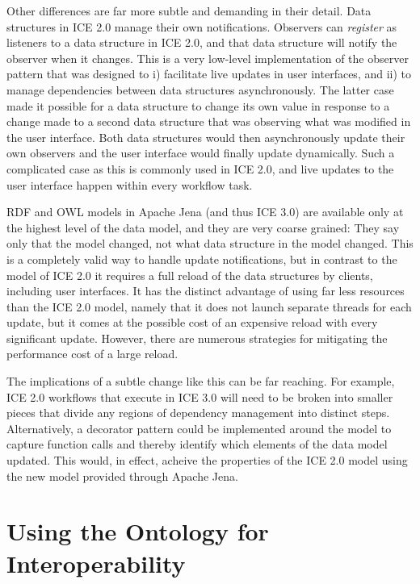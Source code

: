 Other differences are far more subtle and demanding in their detail. Data
structures in ICE 2.0 manage their own notifications. Observers can
\textit{register} as listeners to a data structure in ICE 2.0, and that data
structure will notify the observer when it changes. This is a very low-level
implementation of the observer pattern that was designed
to i) facilitate live updates in user interfaces, and ii) to manage dependencies
between data structures asynchronously. The latter case made it possible for a
data structure to change its own value in response to a change made to a second
data structure that was observing what was modified in the user interface. Both
data structures would then asynchronously update their own observers and the
user interface would finally update dynamically. Such a complicated case as
this is commonly used in ICE 2.0, and live updates to the user interface happen
within every workflow task.

RDF and OWL models in Apache Jena (and thus ICE 3.0) are available only at the
highest level of the data model, and they are very coarse grained: They say only
that the model changed, not what data structure in the model changed. This is a
completely valid way to handle update notifications, but in contrast to the
model of ICE 2.0 it requires a full reload of the data structures by clients,
including user interfaces. It has the distinct advantage of using far less
resources than the ICE 2.0 model, namely that it does not launch separate
threads for each update, but it comes at the possible cost of an expensive
reload with every significant update. However, there are numerous strategies
for mitigating the performance cost of a large reload.

The implications of a subtle change like this can be far reaching. For example,
ICE 2.0 workflows that execute in ICE 3.0 will need to be broken into smaller
pieces that divide any regions of dependency management into distinct steps.
Alternatively, a decorator pattern could be implemented around the model to
capture function calls and thereby identify which elements of the data model
updated. This would, in effect, acheive the properties of the ICE 2.0 model
using the new model provided through Apache Jena.

\section{Using the Ontology for Interoperability}

